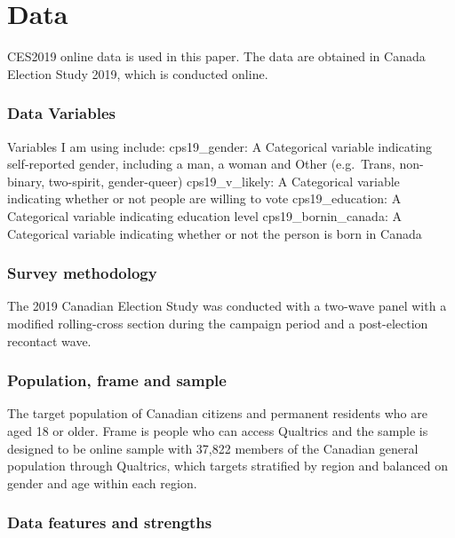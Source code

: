 \documentclass[
]{article}
\begin{document}
\hypertarget{data}{%
\section{Data}\label{data}}

CES2019 online data is used in this paper. The data are obtained in
Canada Election Study 2019, which is conducted online.

\hypertarget{data-variables}{%
\subsubsection{Data Variables}\label{data-variables}}

Variables I am using include: cps19\_gender: A Categorical variable
indicating self-reported gender, including a man, a woman and Other
(e.g.~Trans, non-binary, two-spirit, gender-queer) cps19\_v\_likely: A
Categorical variable indicating whether or not people are willing to
vote cps19\_education: A Categorical variable indicating education level
cps19\_bornin\_canada: A Categorical variable indicating whether or not
the person is born in Canada

\hypertarget{survey-methodology}{%
\subsubsection{Survey methodology}\label{survey-methodology}}

The 2019 Canadian Election Study was conducted with a two-wave panel
with a modified rolling-cross section during the campaign period and a
post-election recontact wave.

\hypertarget{population-frame-and-sample}{%
\subsubsection{Population, frame and
sample}\label{population-frame-and-sample}}

The target population of Canadian citizens and permanent residents who
are aged 18 or older. Frame is people who can access Qualtrics and the
sample is designed to be online sample with 37,822 members of the
Canadian general population through Qualtrics, which targets stratified
by region and balanced on gender and age within each region.

\hypertarget{data-features-and-strengths}{%
\subsubsection{Data features and
strengths}\label{data-features-and-strengths}}
\end{document}
